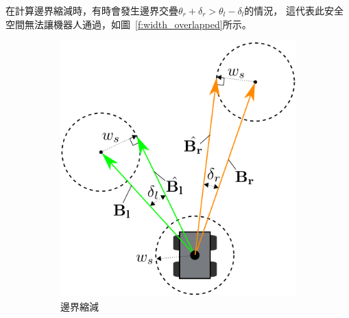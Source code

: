 在計算邊界縮減時，有時會發生邊界交疊$\theta_r + \delta_r > \theta_l - \delta_l$的情況，
這代表此安全空間無法讓機器人通過，如圖~\ref{f:width_overlapped}所示。
\begin{figure}[h!]
	\centering
	\begin{subfigure}[t]{0.5\textwidth}
		\includegraphics[width=\textwidth]{figures/width}
		\caption{邊界縮減}
		\label{f:width}
	\end{subfigure}
	~
	\begin{subfigure}[t]{0.32\textwidth}

\end{subfigure}
\end{figure}
